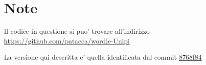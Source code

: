 \section{Note}

Il codice in questione si puo' trovare all'indirizzo \url{https://github.com/patacca/wordle-Unipi}

La versione qui descritta e' quella identificata dal commit \href{https://github.com/patacca/wordle-Unipi/commit/8768f84aa08f2aaa4f4aa59a2d14c351f851b50c}{8768f84}